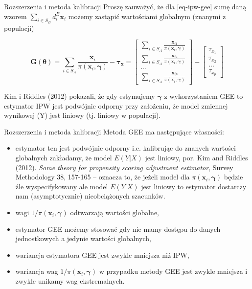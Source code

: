 \documentclass[10pt,ignorenonframetext, aspectratio=169]{beamer}
\newcommand{\bx}{\boldsymbol{x}}
\newcommand{\bG}{\boldsymbol{G}}
\newcommand{\btau}{\boldsymbol{\tau}}
\newcommand{\bgamma}{\boldsymbol{\gamma}}
\newcommand{\btheta}{\boldsymbol{\theta}}
\begin{document}
\begin{frame}{Rozszerzenia i metoda kalibracji}
Proszę zauważyć, że dla \eqref{eq-ipw-gee} sumę daną wzorem $\sum_{i \in S_B} d_i^B \bx_i$ możemy zastąpić wartościami globalnym (znanymi z populacji)

    \begin{equation}
    \bG(\btheta) = \sum_{i \in S_A} \frac{\bx_i}{\pi\left(\bx_i, \bgamma\right)} -\btau_{\bx} = 
    \begin{bmatrix}
    \sum_{i \in S_A} \frac{\bx_{i1}}{\pi\left(\bx_i, \bgamma\right)} \\
    \sum_{i \in S_A} \frac{\bx_{i2}}{\pi\left(\bx_i, \bgamma\right)} \\
    ... \\
    \sum_{i \in S_A} \frac{\bx_{ip}}{\pi\left(\bx_i, \bgamma\right)} 
    \end{bmatrix} - 
    \begin{bmatrix}
     \tau_{x_1} \\
     \tau_{x_2} \\
     ... \\
     \tau_{x_p}
    \end{bmatrix}
    \end{equation}
    
Kim i Riddles (2012) pokazali, że gdy estymujemy $\bgamma$ z wykorzystaniem GEE to estymator IPW jest podwójnie odporny przy założeniu, że model zmiennej wynikowej (Y) jest liniowy (tj. liniowy w populacji).
 
\end{frame}


\begin{frame}{Rozszerzenia i metoda kalibracji}
Metoda GEE ma następujące własności:
    \begin{itemize}
    \justifying
        \item estymator ten jest podwójnie odporny i.e. kalibrując do znanych wartości globalnych zakładamy, że model $E(Y|X)$ jest liniowy, por. Kim  and Riddles (2012). \textit{Some theory for propensity scoring adjustment estimator}, Survey Methodology 38, 157-165 -- oznacza to, że jeżeli model dla $\pi\left(\bx_i, \bgamma\right)$ będzie źle wyspecifykowany ale model $E(Y|X)$ jest liniowy to estymator dostarczy nam (asymptotycznie) nieobciążonych szacunków.
        \item wagi $1/\pi\left(\bx_i, \bgamma\right)$ odtwarzają wartości globalne,
        \item estymator GEE możemy stosować gdy nie mamy dostępu do danych jednostkowych a jedynie wartości globalnych,
        \item wariancja estymatora GEE jest zwykle mniejsza niż IPW,
        \item wariancja wag $1/\pi\left(\bx_i, \bgamma\right)$ w przypadku metody GEE jest zwykle mniejsza i zwykle unikamy wag ekstremalnych.
    \end{itemize}
\end{frame}
\end{document}
